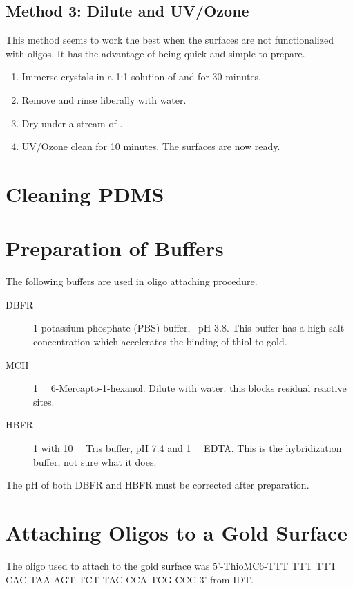 \documentclass[a4paper]{article}
\begin{document}
\subsection{Method 3: Dilute  and UV/Ozone}
This method seems to work the best when the surfaces are not functionalized
with oligos.  It has the advantage of being quick and simple to prepare.
\begin{enumerate}
  \item Immerse crystals in a 1:1 solution of  and  for 30
        minutes.
  \item Remove and rinse liberally with water.
  \item Dry under a stream of .
  \item UV/Ozone clean for 10 minutes.  The surfaces are now ready.
\end{enumerate}

\section{Cleaning PDMS}

\section{Preparation of Buffers}
The following buffers are used in oligo attaching procedure.
\begin{description}
  \item[DBFR] \SI{1}{\Molar} potassium phosphate (PBS) buffer,  pH 3.8.
        This buffer has a high salt concentration which accelerates the binding
        of thiol to gold.
  \item[MCH] \SI{1}{\milli\Molar} 6-Mercapto-1-hexanol.  Dilute with water.
        this blocks residual reactive sites.
  \item[HBFR] \SI{1}{\Molar}  with \SI{10}{\milli\Molar} Tris
        buffer, pH 7.4 and \SI{1}{\milli\Molar} EDTA\@.  This is the hybridization
        buffer, not sure what it does.
\end{description}
The pH of both DBFR and HBFR must be corrected after preparation.

\section{Attaching Oligos to a Gold Surface}
The oligo used to attach to the gold surface was 5'-ThioMC6-TTT TTT TTT CAC
TAA AGT TCT TAC CCA TCG CCC-3' from IDT\@.
\end{document}
